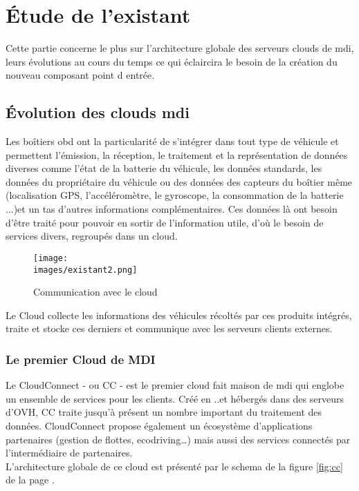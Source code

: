 \section{Étude de l'existant}
   Cette partie concerne le plus sur l'architecture globale des serveurs clouds de \gls{mdi}, leurs évolutions 
   au cours du temps ce qui éclaircira le besoin de la création du nouveau composant 
   point d entrée.  

   \subsection{Évolution des clouds \gls{mdi}}
   Les boîtiers \gls{obd} ont la particularité de s’intégrer dans tout type de véhicule et permettent
   l’émission, la réception, le traitement et la représentation de données diverses comme
   l'état de la batterie du véhicule, les données standards, les données du propriétaire du
   véhicule ou des données des capteurs du boîtier même (localisation GPS,
   l’accéléromètre, le gyroscope, la consommation de la batterie ...)et un tas d'autres informations complémentaires.
   Ces données là ont besoin d'être traité pour pouvoir en sortir de l'information utile, d'où le besoin de services divers, regroupés 
   dans un cloud. \\ 
     \begin{figure}[ht]
        \centering
        \texttt{[image: \\images/existant2.png]}
        \caption{Communication avec le cloud}
    \end{figure}
        
        Le Cloud collecte les informations des véhicules récoltés par ces produits intégrés, traite et stocke ces 
   derniers et communique avec les serveurs clients externes.


    \subsubsection{Le premier Cloud de MDI}
       
    
         Le CloudConnect - ou \gls{CC} - est le premier cloud fait maison de \gls{mdi} qui englobe un ensemble 
        de services pour les clients. Créé en ..et hébergés dans des serveurs d'OVH, \gls{CC} traite 
        jusqu'à présent un nombre important du traitement des données. CloudConnect propose également un écosystème d’applications partenaires (gestion de flottes, ecodriving…) 
        mais aussi des services connectés par l’intermédiaire de partenaires. \\ [0.2cm]
        L'architecture globale de ce cloud est présenté par le schema de la figure \ref{fig:cc} de la page \pageref{fig:cc}.

